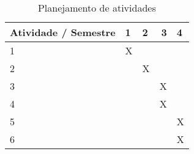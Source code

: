 	\begin{table}[h]
		\centering
		\caption{Planejamento de atividades}
		\label{tab-cronograma}
		\begin{tabular}{lllrl}
			\multicolumn{1}{c}{Atividade / Semestre} & 1 & 2 & 3 & 4 \\ \hline
			1                                        & X &   &   &   \\
			2                                        &   & X &   &   \\
			3                                        &   &   & X &   \\
			4                                        &   &   & X &   \\
			5                                        &   &   &   & X \\
			6                                        &   &   &   & X
		\end{tabular}
	\end{table}